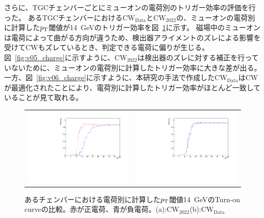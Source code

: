さらに、TGCチェンバーごとにミューオンの電荷別のトリガー効率の評価を行った。
あるTGCチェンバーにおける$\mathrm{CW_{Data}}$と$\mathrm{CW_{2022}}$の、ミューオンの電荷別に計算した$p_{\rm{T}}$閾値が14~GeVのトリガー効率を図~\ref{Eff_Chage}に示す。
磁場中のミューオンは電荷によって曲がる方向が違うため、検出器アライメントのズレによる影響を受けてCWもズレているとき、判定できる電荷に偏りが生じる。図~\ref{fig:v05_charge}に示すように、$\mathrm{CW_{2022}}$は検出器のズレに対する補正を行っていないために、ミューオンの電荷別に計算したトリガー効率に大きな差が出る。
一方、図~\ref{fig:v06_charge}に示すように、本研究の手法で作成した$\mathrm{CW_{Data}}$はCWが最適化されたことにより、電荷別に計算したトリガー効率がほとんど一致していることが見て取れる。
\begin{figure}
    \begin{tabular}{cc}
    \begin{minipage}[b]{0.45\hsize}
        \includegraphics[clip, width=7cm]{fig/5/Eff_PNcharge_v05_phi0eta10.pdf}
        \subcaption{}
        \label{fig:v05_charge}
    \end{minipage}&
    \begin{minipage}[b]{0.45\hsize}
        \includegraphics[clip, width=7cm]{fig/5/Eff_PNcharge_MLP_phi0eta10.pdf}
        \subcaption{}
        \label{fig:v06_charge}
    \end{minipage}
    \end{tabular}
    \caption{あるチェンバーにおける電荷別に計算した$p_{\rm{T}}$閾値14~GeVのTurn-on curveの比較。赤が正電荷、青が負電荷。(a):$\mathrm{CW_{2022}}$(b):$\mathrm{CW_{Data}}$}
    \label{Eff_Chage}
\end{figure}

